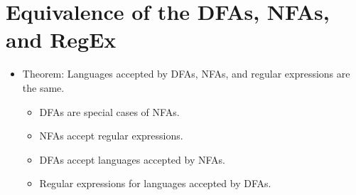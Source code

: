 \documentclass[12pt]{article}
\date{February 9, 2021}
\begin{document}
\maketitle

\section{Equivalence of the DFAs, NFAs, and RegEx}
\begin{itemize}
    \item Theorem: Languages accepted by DFAs, NFAs, and regular expressions are the same.
    \begin{itemize}
        \item DFAs are special cases of NFAs.
        \item NFAs accept regular expressions.
        \item DFAs accept languages accepted by NFAs.
        \item Regular expressions for languages accepted by DFAs.
    \end{itemize}
\end{itemize}
\end{document}
